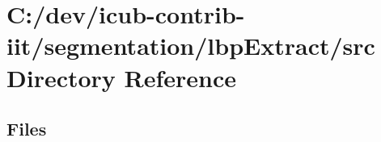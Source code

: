\section{C\+:/dev/icub-\/contrib-\/iit/segmentation/lbp\+Extract/src Directory Reference}
\label{dir_8d9d9bdc26a269a8f1cf3fc08bb9144a}
\subsection*{Files}
\begin{DoxyCompactItemize}
\end{DoxyCompactItemize}
